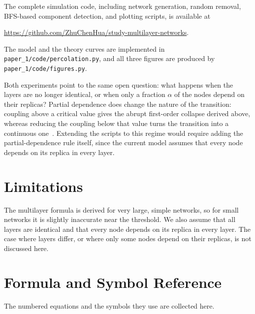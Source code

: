 \documentclass[11pt]{article}
\begin{document}
The complete simulation code, including network generation, random removal, BFS-based component detection, and plotting scripts, is available at
\begin{center}
  \url{https://github.com/ZhuChenHua/study-multilayer-networks}.
\end{center}
The model and the theory curves are implemented in \texttt{paper\_1/code/percolation.py}, and all three figures are produced by \texttt{paper\_1/code/figures.py}.

Both experiments point to the same open question: what happens when the layers are no longer identical, or when only a fraction $\alpha$ of the nodes depend on their replicas? Partial dependence does change the nature of the transition: coupling above a critical value gives the abrupt first-order collapse derived above, whereas reducing the coupling below that value turns the transition into a continuous one~\cite{parshani2010}. Extending the scripts to this regime would require adding the partial-dependence rule itself, since the current model assumes that every node depends on its replica in every layer.

\section*{Limitations}
The multilayer formula is derived for very large, simple networks, so for small networks it is slightly inaccurate near the threshold. We also assume that all layers are identical and that every node depends on its replica in every layer. The case where layers differ, or where only some nodes depend on their replicas, is not discussed here.



\appendix
\section{Formula and Symbol Reference}
The numbered equations and the symbols they use are collected here.
\end{document}
